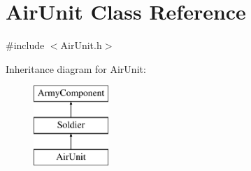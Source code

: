 \hypertarget{class_air_unit}{}\section{Air\+Unit Class Reference}
\label{class_air_unit}


{\ttfamily \#include $<$Air\+Unit.\+h$>$}

Inheritance diagram for Air\+Unit\+:\begin{figure}[H]
\begin{center}
\leavevmode
\includegraphics[height=3.000000cm]{class_air_unit}
\end{center}
\end{figure}
